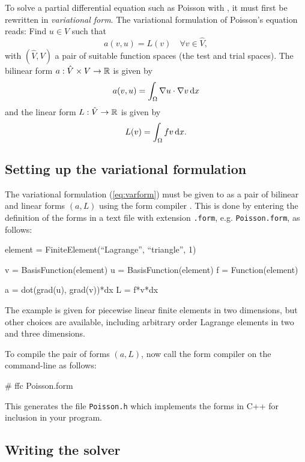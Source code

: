To solve a partial differential equation such as Poisson
with \dolfin{}, it must first be rewritten in \emph{variational form}.
The variational formulation of Poisson's equation reads:
Find $u \in V$ such that
\begin{equation} \label{eq:varform}
  a(v, u) = L(v) \quad \forall v\in \hat{V}, 
\end{equation}
with $(\hat{V}, V)$ a pair of suitable function spaces (the test and
trial spaces). The bilinear form $a : \hat{V} \times V \rightarrow
\mathbb{R}$ is given by
\begin{equation}
  a(v, u) = \int_{\Omega} \nabla u \cdot \nabla v \, \mathrm{d}x
\end{equation}
and the linear form $L : \hat{V} \rightarrow \mathbb{R}$ is given by
\begin{equation}
  L(v) = \int_{\Omega} f v \, \mathrm{d}x.
\end{equation}

\subsection{Setting up the variational formulation}

The variational formulation (\ref{eq:varform}) must be given to
\dolfin{} as a pair of bilinear and linear forms $(a, L)$ using the
form compiler \ffc{}. This is done by entering the definition of
the forms in a text file with extension \texttt{.form},
e.g. \texttt{Poisson.form}, as follows:
\begin{code}
  element = FiniteElement(``Lagrange'', ``triangle'', 1)

  v = BasisFunction(element)
  u = BasisFunction(element)
  f = Function(element)
  
  a = dot(grad(u), grad(v))*dx
  L = f*v*dx
\end{code}

The example is given for piecewise linear finite elements in two
dimensions, but other choices are available, including arbitrary order
Lagrange elements in two and three dimensions.

To compile the pair of forms $(a, L)$, now call the form compiler on
the command-line as follows:
\begin{code}
  # ffc Poisson.form
\end{code}
This generates the file \texttt{Poisson.h} which implements the forms
in C++ for inclusion in your \dolfin{} program.

\subsection{Writing the solver}

